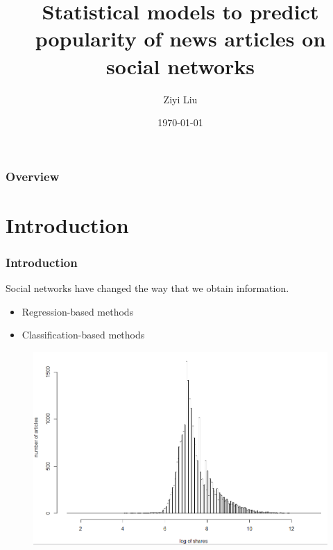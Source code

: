 \documentclass{beamer}
\title[Master Oral Defense]{Statistical models to predict popularity of news articles on social networks} %
\author{Ziyi Liu} %
\institute[Math WUSTL] %
{
Department of Mathematics \\
Washington University in St. Louis \\ %
\medskip
\textit{ziyi.liu@wustl.edu} %
}
\date{\today} %
\begin{document}
\begin{frame}
\titlepage %
\end{frame}

\begin{frame}
\frametitle{Overview} %
\tableofcontents %
\end{frame}


\section{Introduction} %

\begin{frame}
\frametitle{Introduction}
Social networks have changed the way that we obtain information.   

\begin{itemize}
    \item Regression-based methods
    \item Classification-based methods
\end{itemize}

\begin{figure}
\includegraphics[width=0.7\linewidth]{logy.png}
\end{figure}

\end{frame}
\end{document}
